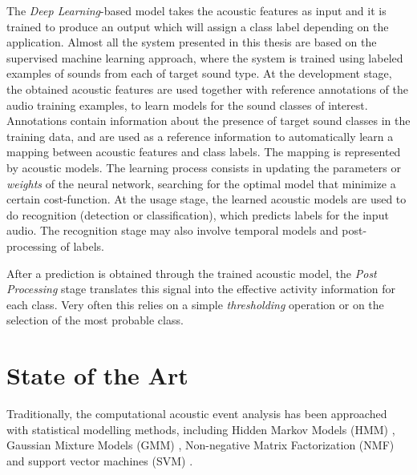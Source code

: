 The \textit{Deep Learning}-based model takes the acoustic features as input and it is trained to produce an output which will assign a class label depending on the application. Almost all the system presented in this thesis are based on the supervised machine learning approach, where the system is trained using labeled examples of sounds from each of target sound type. 
At the development stage, the obtained acoustic features are used together with
reference annotations of the audio training examples, to learn models for the
sound classes of interest. Annotations contain information about the presence of
target sound classes in the training data, and are used as a reference information
to automatically learn a mapping between acoustic features and class labels. The
mapping is represented by acoustic models. The learning process consists in updating the parameters or \textit{weights} of the neural network, searching for the optimal model that minimize a certain cost-function. 
At the usage stage, the learned acoustic models are used to do recognition (detection or classification), which predicts labels
for the input audio. The recognition stage may also involve temporal models and
post-processing of labels.


After a prediction is obtained through the trained acoustic model, the \textit{Post Processing} stage translates this signal into the effective activity information for each class. Very often this relies on a simple \textit{thresholding} operation or on the selection of the most probable class.


\section{State of the Art}

Traditionally, the computational acoustic event analysis has been approached with statistical modelling methods, including Hidden Markov Models (HMM) \cite{degara2011onset}, Gaussian Mixture Models (GMM) \cite{heittola2010audio}, Non-negative Matrix Factorization (NMF) \cite{carabias2011musical} and support vector machines (SVM) \cite{guo2003content}. 

